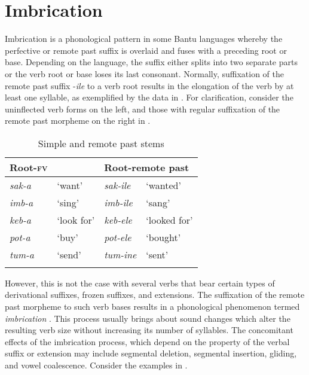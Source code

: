 \documentclass[output=paper]{langsci/langscibook}
\begin{document}
\section{Imbrication} \label{§4:imbrication.kawasha}

Imbrication is a phonological pattern in some Bantu languages whereby the perfective or remote past suffix is overlaid and fuses with a preceding root or base. Depending on the language, the suffix either splits into two separate parts or the verb root or base loses its last consonant. Normally, suffixation of the remote past suffix -\textit{ile} to a verb root results in the elongation of the verb by at least one syllable, as exemplified by the data in . For clarification, consider the uninflected verb forms on the left, and those with regular suffixation of the remote past morpheme on the right in . 

\begin{table}
\begin{tabularx}{.75\textwidth}{lXlX}
\lsptoprule
Root-\textsc{fv} &  & \multicolumn{2}{l}{Root-remote past} \\
\midrule
\textit{sak-a} & `want' & \textit{sak-ile} & `wanted' \\
\textit{imb-a} & `sing' & \textit{imb-ile} & `sang' \\
\textit{keb-a} & `look for' & \textit{keb-ele} & `looked for' \\
\textit{pot-a} & `buy' & \textit{pot-ele} & `bought' \\
\textit{tum-a} & `send' & \textit{tum-ine} & `sent' \\

\lspbottomrule
\end{tabularx}

\caption{Simple and remote past stems}
\label{tab:18.kawasha}

\end{table}

However, this is not the case with several verbs that bear certain types of derivational suffixes, frozen suffixes, and extensions. The suffixation of the remote past morpheme to such verb bases results in a phonological phenomenon termed \textit{imbrication} \citep{bastin1983}. This process usually brings about sound changes which alter the resulting verb size without increasing its number of syllables. The concomitant effects of the imbrication process, which depend on the property of the verbal suffix or extension may include segmental deletion, segmental insertion, gliding, and vowel coalescence. Consider the examples in . 
\end{document}
